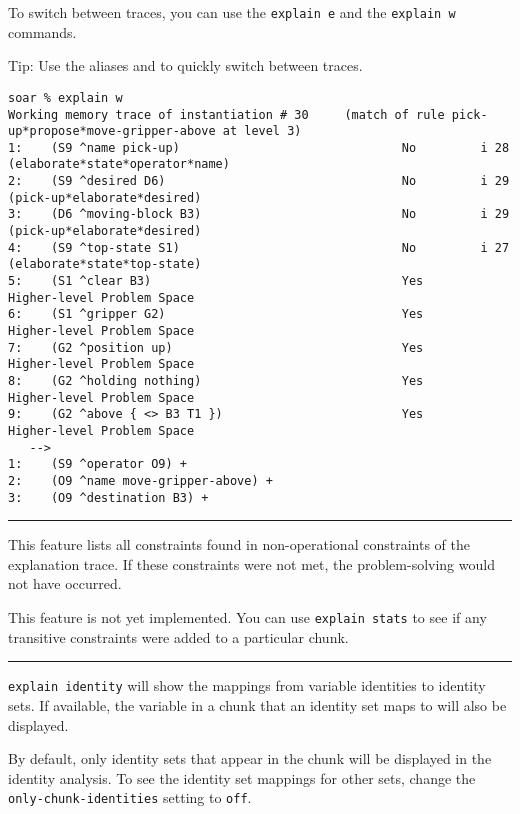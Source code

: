 To switch between traces, you can use the \texttt{explain\ e} and the
\texttt{explain\ w} commands.

Tip: Use the aliases  and  to quickly switch between traces.

{\scriptsize
\begin{verbatim}
soar % explain w
Working memory trace of instantiation # 30     (match of rule pick-up*propose*move-gripper-above at level 3)
1:    (S9 ^name pick-up)                               No         i 28 (elaborate*state*operator*name)
2:    (S9 ^desired D6)                                 No         i 29 (pick-up*elaborate*desired)
3:    (D6 ^moving-block B3)                            No         i 29 (pick-up*elaborate*desired)
4:    (S9 ^top-state S1)                               No         i 27 (elaborate*state*top-state)
5:    (S1 ^clear B3)                                   Yes        Higher-level Problem Space
6:    (S1 ^gripper G2)                                 Yes        Higher-level Problem Space
7:    (G2 ^position up)                                Yes        Higher-level Problem Space
8:    (G2 ^holding nothing)                            Yes        Higher-level Problem Space
9:    (G2 ^above { <> B3 T1 })                         Yes        Higher-level Problem Space
   -->
1:    (S9 ^operator O9) +
2:    (O9 ^name move-gripper-above) +
3:    (O9 ^destination B3) +
\end{verbatim}
}

\rule{\textwidth}{1pt}

\textbf{}

This feature lists all constraints found in non-operational constraints of the explanation trace.  
If these constraints were not met, the problem-solving would not have occurred.

This feature is not yet implemented. You can use \texttt{explain\ stats}
to see if any transitive constraints were added to a particular chunk.

\rule{\textwidth}{1pt}

\textbf{}

\texttt{explain\ identity} will show the mappings from variable
identities to identity sets. If available, the variable in a chunk that
an identity set maps to will also be displayed.

By default, only identity sets that appear in the chunk will be
displayed in the identity analysis. To see the identity set mappings for
other sets, change the \texttt{only-chunk-identities} setting to
\texttt{off}.

